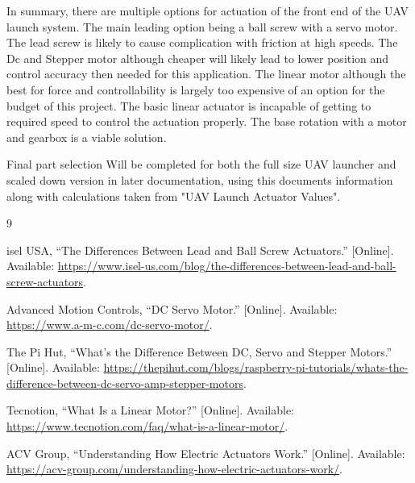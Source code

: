\documentclass{article}
\begin{document}
In summary, there are multiple options for actuation of the front end of the UAV launch 
system. The main leading option being a ball screw with a servo motor. 
\newline
\newline 
The lead screw is likely 
to cause complication with friction at high speeds. The Dc and Stepper motor although cheaper 
will likely lead to lower position and control accuracy then needed for this application. 
The linear motor although the best for force and controllability is largely too 
expensive of an option for the budget of this project. The basic linear actuator 
is incapable of getting to required speed to control the actuation properly.
The base rotation with a motor and gearbox is a viable solution. \newline

Final part selection Will be completed for both the full size UAV launcher and scaled down
version in later documentation, using this documents information along with calculations taken from
"UAV Launch Actuator Values". 

\begin{thebibliography}{9}

isel USA, ``The Differences Between Lead and Ball Screw Actuators.''
[Online]. Available: \url{https://www.isel-us.com/blog/the-differences-between-lead-and-ball-screw-actuators}.

Advanced Motion Controls, ``DC Servo Motor.''
[Online]. Available: \url{https://www.a-m-c.com/dc-servo-motor/}.

The Pi Hut, ``What's the Difference Between DC, Servo and Stepper Motors.''
[Online]. Available: \url{https://thepihut.com/blogs/raspberry-pi-tutorials/whats-the-difference-between-dc-servo-amp-stepper-motors}.

Tecnotion, ``What Is a Linear Motor?''
[Online]. Available: \url{https://www.tecnotion.com/faq/what-is-a-linear-motor/}.

ACV Group, ``Understanding How Electric Actuators Work.''
[Online]. Available: \url{https://acv-group.com/understanding-how-electric-actuators-work/}.

\end{thebibliography}
\end{document}
